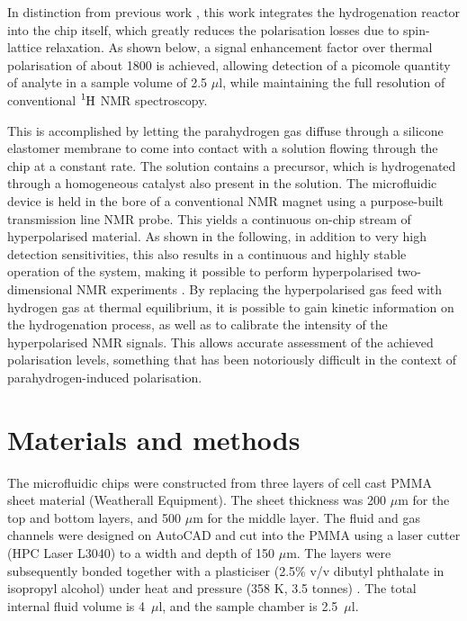 In distinction from previous work
\cite{bhattacharya2007towards,chekmenev2008pasadena,
chekmenev2009hyperpolarized,shchepin2014parahydrogen,
Reineri:2015he,cavallari201813,eills2017singlet,Lehmkuhl:2018cd},
this work integrates the hydrogenation reactor into the chip itself, which greatly
reduces the polarisation losses due to spin-lattice relaxation.
As shown below, a signal enhancement factor over thermal polarisation
of about 1800 is achieved, allowing detection of a
picomole quantity of analyte in a sample volume of 2.5 $\mu$l,
while maintaining the full resolution of conventional $\ce{^1H}$
NMR spectroscopy.

This is accomplished by letting the parahydrogen gas diffuse through a
silicone elastomer membrane \cite{Lehmkuhl:2018cd}
to come into contact with a solution
flowing through the chip at a constant rate. The solution
contains a precursor, which is hydrogenated through a homogeneous
catalyst also present in the solution.
The microfluidic device is held in the bore of a conventional
NMR magnet using a purpose-built transmission line NMR probe.
This yields a continuous on-chip stream of hyperpolarised material. As shown
in the following, in addition to very high detection
sensitivities, this also results in a continuous and highly stable operation
of the system, making it possible to perform hyperpolarised
two-dimensional NMR experiments \cite{Roth:2010hk,Giraudeau:2009fn,Lloyd:2012cf,Eshuis:2015ce}.
By replacing the hyperpolarised gas feed with hydrogen gas at thermal
equilibrium, it is possible to gain kinetic information on the hydrogenation
process, as well as to calibrate the intensity of the hyperpolarised NMR signals.
This allows accurate assessment of the achieved polarisation levels, something
that has been notoriously difficult in the context of
parahydrogen-induced polarisation.


\section{Materials and methods}\label{pHMaterialandMethods}
The
microfluidic chips were constructed from three layers of cell cast PMMA sheet
material (Weatherall Equipment).  The sheet thickness was 200 $\mu$m for the
top and bottom layers, and 500 $\mu$m for the middle layer. The fluid and gas
channels were designed on AutoCAD and cut into the PMMA using a laser cutter
(HPC Laser L3040) to a width and depth of 150 $\mu$m. The layers were
subsequently bonded together with a plasticiser (2.5\% v/v dibutyl phthalate in
isopropyl alcohol) under heat and pressure (358 K, 3.5
tonnes) \cite{Yilmaz:2016fx}. The total internal fluid volume is 4~$\mu$l, and
the sample chamber is 2.5~$\mu$l.

